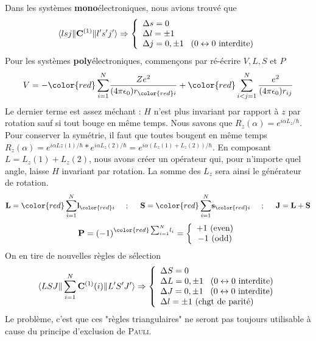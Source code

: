 Dans les systèmes \textbf{mono}électroniques, nous avions trouvé que
\begin{equation}
\langle l s j \Vert {\bf C}^{(1)} \Vert l's' j' \rangle 
\Rightarrow 
\left\{
\begin{array}{l}
\Delta s = 0 \\
\Delta l = \pm 1 \\
\Delta j = 0, \pm 1 \; \; \; (0 \leftrightarrow 0 ~\mbox{interdite})
\end{array}
\right.
\end{equation}
Pour les systèmes \textbf{poly}électroniques, commençons par ré-écrire $V, L, S$ et $P$
\begin{equation}
V = 
-  {\color{red} \sum_{i=1}^N }  
\frac{Ze^2}{(4 \pi \epsilon_0) r_{{\color{red} i }}  } 
+  {\color{red}
\sum_{i < j=1}^N 
\frac{e^2}{(4 \pi \epsilon_0) r_{ij}}
}
\end{equation}
Le dernier terme est assez méchant : $H$ n'est plus invariant par rapport à $z$ par rotation sauf
si tout bouge en même temps. Nous savons que $R_z(\alpha) = e^{i\alpha L_z/\hbar}$. Pour conserver
la symétrie, il faut que toutes bougent en même temps $R_z(\alpha) = e^{i\alpha Lz(1)/\hbar} * e^{i\alpha L_z(2)/\hbar} = e^{i\alpha( L_z(1) + L_z(2))/\hbar}$. En composant $L=L_z(1)+L_z(2)$, nous
avons créer un opérateur qui, pour n'importe quel angle, laisse $H$ invariant par rotation. La 
somme des $L_z$ sera ainsi le générateur de rotation.
\begin{equation}
{\bf L}  =     {\color{red} \sum_{i=1}^N }  
{\bf l}_{{\color{red} i }} 
\hspace*{0.5cm} ;  \hspace*{0.5cm} 
{\bf S}  =  
  {\color{red} \sum_{i=1}^N }   
{\bf s}_{{\color{red} i }} 
\hspace*{0.5cm} ;  \hspace*{0.5cm} 
{\bf J} =  {\bf L} + {\bf S}
\end{equation}
\begin{equation}
{\bf P}  =  (-1)^{   {\color{red} \sum_{i=1}^N }  l_i  }
= \left\{
\begin{array}{c}
+1 ~\mbox{(even)} \\ -1 ~\mbox{(odd)}
\end{array}
\right.
\end{equation}
On en tire de nouvelles règles de sélection
\begin{equation}
\langle L S J  \Vert 
\sum_{i=1}^N {\bf C}^{(1)}(i)  \Vert L'S' J' \rangle 
\Rightarrow 
\left\{
\begin{array}{l}
\Delta S = 0 \\
\Delta L = 0, \pm 1 
\; \; \; (0 \leftrightarrow 0 ~\mbox{interdite}) \\
\Delta J = 0, \pm 1 
\; \; \; (0 \leftrightarrow 0 ~\mbox{interdite}) \\
\Delta l = \pm 1 ~\mbox{(chgt de parit\'e)}
\end{array}
\right.
\end{equation}
Le problème, c'est que ces "règles triangulaires" ne seront pas toujours utilisable à cause du
principe d'exclusion de \textsc{Pauli}.\newpage

